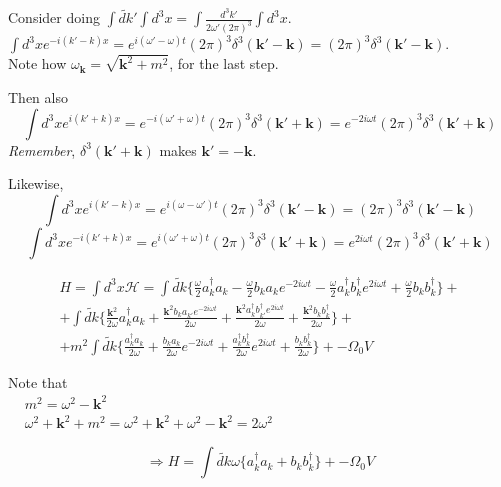 \documentclass[twoside]{amsart}
\begin{document}
\begin{itemize}
Consider doing $\int \widetilde{dk}' \int d^3 x = \int \frac{d^3k'}{2\omega'(2\pi)^3 } \int d^3x$.  \\

$\int d^3x e^{-i(k'-k)x} = e^{i(\omega' - \omega)t} (2\pi)^3 \delta^3(\mathbf{k}' - \mathbf{k}) = (2\pi)^3 \delta^3(\mathbf{k'}-\mathbf{k})$.  \\
Note how $\omega_{\mathbf{k}} = \sqrt{ \mathbf{k}^2 + m^2}$, for the last step.  

Then also
\[
\int d^3x e^{i(k'+k)x} = e^{-i(\omega' + \omega) t} (2\pi)^3 \delta^3(\mathbf{k}' + \mathbf{k}) = e^{-2i\omega t}(2\pi)^3 \delta^3(\mathbf{k}'+\mathbf{k})
\]
\emph{Remember}, $\delta^3(\mathbf{k}'+\mathbf{k})$ makes $\mathbf{k}' = - \mathbf{k}$.  

Likewise,
\[
\int d^3x e^{i(k'-k)x} = e^{i(\omega - \omega')t} (2\pi)^3 \delta^3(\mathbf{k}' - \mathbf{k}) = (2\pi)^3 \delta^3(\mathbf{k}'-\mathbf{k})
\]
\[
\int d^3x e^{-i(k'+k)x} = e^{i(\omega' + \omega) t} (2\pi)^3 \delta^3(\mathbf{k}' + \mathbf{k}) = e^{2i\omega t}(2\pi)^3 \delta^3(\mathbf{k}'+\mathbf{k})
\]

\[
\begin{gathered}
  H = \int d^3x \mathcal{H} = \int \widetilde{dk} \lbrace \frac{ \omega}{2} a_k^{\dag} a_k - \frac{ \omega}{2} b_k a_k e^{-2i\omega t} - \frac{ \omega}{2} a_k^{\dag} b_k^{\dag} e^{2i\omega t} + \frac{ \omega }{2} b_k b_k^{\dag} \rbrace + \\ 
  + \int \widetilde{dk} \lbrace \frac{ \mathbf{k}^2 }{2\omega } a_k^{\dag} a_k + \frac{ \mathbf{k}^2 b_k a_{k'} e^{-2i\omega t} }{ 2\omega } + \frac{ \mathbf{k}^2 a_k^{\dag} b_{k'}^{\dag} e^{2i\omega t} }{2\omega} + \frac{ \mathbf{k}^2 b_k b_k^{\dag} }{ 2\omega } \rbrace + \\ 
  + m^2 \int \widetilde{dk} \lbrace \frac{ a_k^{\dag} a_k}{ 2\omega} + \frac{ b_k a_k}{2\omega} e^{-2i\omega t} + \frac{ a_k^{\dag} b_k^{\dag}}{2\omega } e^{2i\omega t} + \frac{ b_k b_k^{\dag}}{2\omega} \rbrace + - \Omega_0 V
\end{gathered}
\]

Note that \\
$\begin{aligned}
& m^2 = \omega^2 - \mathbf{k}^2 \\ 
& \omega^2 + \mathbf{k}^2 + m^2 = \omega^2 + \mathbf{k}^2 + \omega^2 - \mathbf{k}^2 = 2\omega^2
\end{aligned}$

\[
\Longrightarrow H  =\int \widetilde{dk} \omega \lbrace a_k^{\dag} a_k + b_k b_k^{\dag} \rbrace + - \Omega_0 V
\]


\end{itemize}
\end{document}

